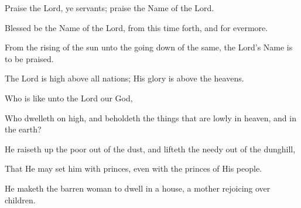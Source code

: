 Praise the Lord, ye servants; praise the Name of the Lord.

Blessed be the Name of the Lord, from this time forth, and for evermore.

From the rising of the sun unto the going down of the same, the Lord’s Name is to be praised.

The Lord is high above all nations; His glory is above the heavens.

Who is like unto the Lord our God,

Who dwelleth on high, and beholdeth the things that are lowly in heaven, and in the earth?

He raiseth up the poor out of the dust, and lifteth the needy out of the dunghill,

That He may set him with princes, even with the princes of His people.

He maketh the barren woman to dwell in a house, a mother rejoicing over children.
